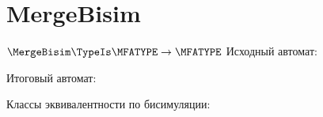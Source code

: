 \section{MergeBisim}
\begin{frame}{$\MergeBisim\TypeIs\MFATYPE\to\MFATYPE$}
	Исходный автомат:


	Итоговый автомат:


	Классы эквивалентности по бисимуляции:


\end{frame}